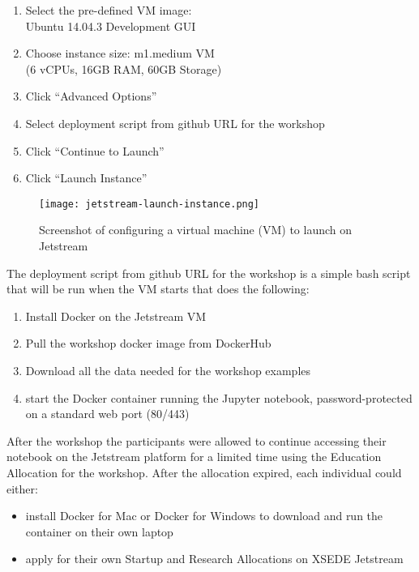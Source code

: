 \begin{enumerate}
\item Select the pre-defined VM image: \\Ubuntu 14.04.3 Development GUI
\item Choose instance size: m1.medium VM \\(6 vCPUs, 16GB RAM, 60GB
  Storage)
\item Click ``Advanced Options''
\item Select deployment script from github URL for the workshop
\item Click ``Continue to Launch''
\item Click ``Launch Instance''
\end{enumerate}

\begin{figure}[h]
\centering
\texttt{[image: jetstream-launch-instance.png]}
\caption{Screenshot of configuring a virtual machine (VM) to launch on Jetstream}
\end{figure}

The deployment script from github URL for the workshop is a simple bash script
that will be run when the VM starts that does the following:

\begin{enumerate}
\item Install Docker on the Jetstream VM
\item Pull the workshop docker image from DockerHub
\item Download all the data needed for the workshop examples
\item start the Docker container running the Jupyter notebook, password-protected on a standard web port (80/443)
\end{enumerate}

After the workshop the participants were allowed to continue accessing their
notebook on the Jetstream platform for a limited time using the Education
Allocation for the workshop. After the allocation expired, each individual could
either:

\begin{itemize}

\item install Docker for Mac or Docker for Windows to download and run the
      container on their own laptop
\item apply for their own Startup and Research Allocations on XSEDE Jetstream

\end{itemize}

